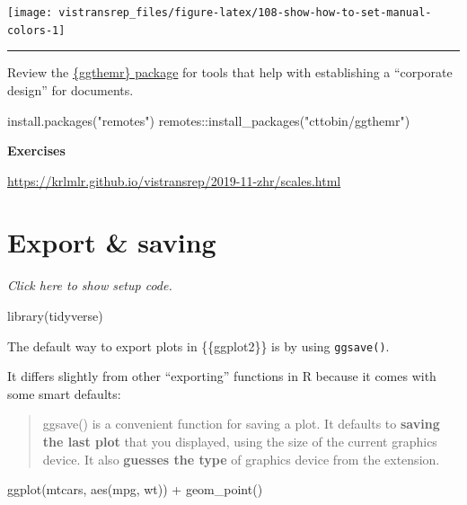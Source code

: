 \documentclass[]{book}
\newenvironment{Shaded}{}{}
\newcommand{\KeywordTok}[1]{\textcolor[rgb]{0.00,0.00,1.00}{#1}}
\newcommand{\NormalTok}[1]{#1}
\newcommand{\OperatorTok}[1]{#1}
\newcommand{\StringTok}[1]{\textcolor[rgb]{0.00,0.50,0.50}{#1}}
\begin{document}
\begin{flushright}\texttt{[image: vistransrep\_files/figure-latex/108-show-how-to-set-manual-colors-1]} \end{flushright}

\begin{center}\rule{0.5\linewidth}{\linethickness}\end{center}

Review the \href{https://github.com/cttobin/ggthemr}{\{ggthemr\} package} for tools that help with establishing a ``corporate design'' for documents.

\begin{Shaded}
\begin{Highlighting}[]
\KeywordTok{install.packages}\NormalTok{(}\StringTok{"remotes"}\NormalTok{)}
\NormalTok{remotes}\OperatorTok{::}\KeywordTok{install_packages}\NormalTok{(}\StringTok{"cttobin/ggthemr"}\NormalTok{)}
\end{Highlighting}
\end{Shaded}

\textbf{Exercises}

\url{https://krlmlr.github.io/vistransrep/2019-11-zhr/scales.html}

\hypertarget{export-saving}{%
\section{Export \& saving}\label{export-saving}}

\emph{Click here to show setup code.}

\begin{Shaded}
\begin{Highlighting}[]
\KeywordTok{library}\NormalTok{(tidyverse)}
\end{Highlighting}
\end{Shaded}

The default way to export plots in \{\{ggplot2\}\} is by using \texttt{ggsave()}.

It differs slightly from other ``exporting'' functions in R because it comes with some smart defaults:

\begin{quote}
ggsave() is a convenient function for saving a plot. It defaults to \textbf{saving the last plot} that you displayed, using the size of the current graphics device. It also \textbf{guesses the type} of graphics device from the extension.
\end{quote}

\begin{Shaded}
\begin{Highlighting}[]
\KeywordTok{ggplot}\NormalTok{(mtcars, }\KeywordTok{aes}\NormalTok{(mpg, wt)) }\OperatorTok{+}
\StringTok{  }\KeywordTok{geom_point}\NormalTok{()}
\end{Highlighting}
\end{Shaded}
\end{document}
